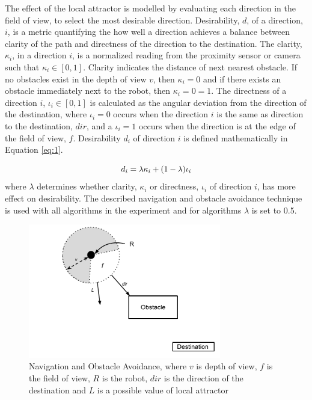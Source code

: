 The effect of the local attractor is modelled by  evaluating each direction in the field of view, to select the most desirable direction. Desirability, $d$, of a direction, $i$, is a metric quantifying the how well a direction achieves a balance between clarity of the path and directness of the direction to the destination. The clarity, $\kappa_i$, in a direction $i$, is a normalized reading from the proximity sensor or camera such that $\kappa_i\in[0,1]$. Clarity indicates the distance of next nearest obstacle. If no obstacles exist in the depth of view $v$, then  $\kappa_i=0$ and if there exists an obstacle immediately next to the robot, then $\kappa_i=0=1$. The directness of a direction $i$, $\iota_i\in[0,1]$ is calculated as the angular deviation from the direction of the destination, where $\iota_i=0$ occurs when the direction $i$ is the same as direction to the destination, $dir$, and a $\iota_i=1$ occurs when the direction is at the edge of the field of view, $f$. Desirability $d_i$ of direction $i$ is defined mathematically in Equation \ref{eq:1}.

\begin{equation}
	d_i= \lambda \kappa_i + (1 - \lambda)\iota_i \\
	\label{eq:1}
\end{equation} where $\lambda$ determines whether clarity, $\kappa_i$ or directness, $\iota_i$ of direction $i$, has more effect on desirability. The described navigation and obstacle avoidance technique is used with all algorithms in the experiment and for algorithms $\lambda$ is set to 0.5.

\begin{figure}
	\centering
	\includegraphics[width=0.75\textwidth]{chapters/chapter5/figures/ObstacleAvoidance.pdf}
	\caption{Navigation and Obstacle Avoidance, where $v$ is depth of view, $f$ is the field of view, $R$ is the robot, $dir$ is the direction of the destination and $L$ is a possible value of local attractor}
	\label{fig:obstacleavoidance}
\end{figure}


